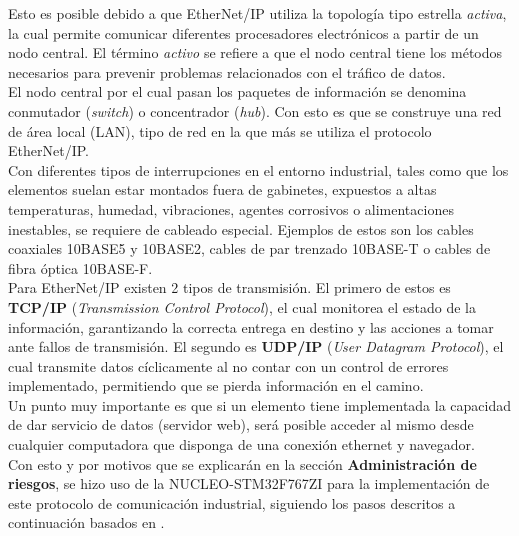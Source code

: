 Esto es posible debido a que EtherNet/IP utiliza la topología tipo estrella \textit{activa}, la cual permite comunicar diferentes procesadores electrónicos a partir de un nodo central. El término \textit{activo} se refiere a que el nodo central tiene los métodos necesarios para prevenir problemas relacionados con el tráfico de datos.\\

El nodo central por el cual pasan los paquetes de información se denomina conmutador (\textit{switch}) o concentrador (\textit{hub}). Con esto es que se construye una red de área local (LAN), tipo de red en la que más se utiliza el protocolo EtherNet/IP.\\

Con diferentes tipos de interrupciones en el entorno industrial, tales como que los elementos suelan estar montados fuera de gabinetes, expuestos a altas temperaturas, humedad, vibraciones, agentes corrosivos o alimentaciones inestables, se requiere de cableado especial. Ejemplos de estos son los cables coaxiales 10BASE5 y 10BASE2, cables de par trenzado 10BASE-T o cables de fibra óptica 10BASE-F.\\

Para EtherNet/IP existen 2 tipos de transmisión. El primero de estos es \textbf{TCP/IP} (\textit{Transmission Control Protocol}), el cual monitorea el estado de la información, garantizando la correcta entrega en destino y las acciones a tomar ante fallos de transmisión. El segundo es \textbf{UDP/IP} (\textit{User Datagram Protocol}), el cual transmite datos cíclicamente al no contar con un control de errores implementado, permitiendo que se pierda información en el camino.\\

Un punto muy importante es que si un elemento tiene implementada la capacidad de dar servicio de datos (servidor web), será posible acceder al mismo desde cualquier computadora que disponga de una conexión ethernet y navegador.\\

Con esto y por motivos que se explicarán en la sección \textbf{Administración de riesgos}, se hizo uso de la NUCLEO-STM32F767ZI para la implementación de este protocolo de comunicación industrial, siguiendo los pasos descritos a continuación basados en \cite{DDC10}.

